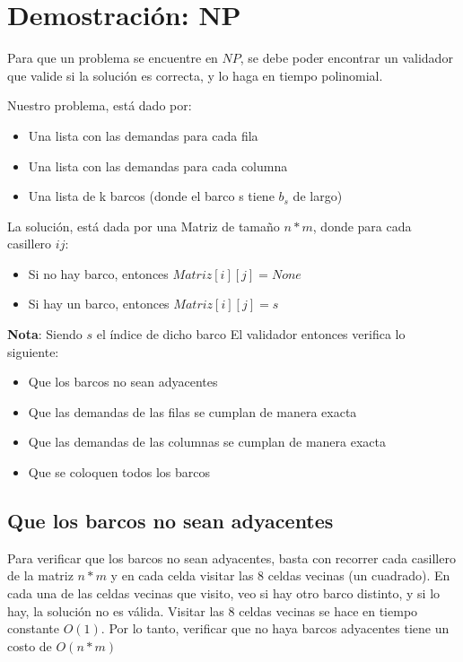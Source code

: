 \section{Demostración: NP}

Para que un problema se encuentre en $NP$, se debe poder encontrar un validador que valide si la solución es correcta, y lo haga en tiempo polinomial.

\vskip0.25cm

Nuestro problema, está dado por:

\begin{itemize}
    \item Una lista con las demandas para cada fila
    \item Una lista con las demandas para cada columna
    \item Una lista de k barcos (donde el barco s tiene $b_{s}$ de largo)
\end{itemize}

La solución, está dada por una Matriz de tamaño $n * m$, donde para cada casillero $ij$:

\begin{itemize}
    \item Si no hay barco, entonces $Matriz[i][j] = None$
    \item Si hay un barco, entonces $Matriz[i][j] = s$
\end{itemize}

\textbf{Nota}: Siendo $s$ el índice de dicho barco
\vskip0.25cm
El validador entonces verifica lo siguiente:

\begin{itemize}
    \item Que los barcos no sean adyacentes
    \item Que las demandas de las filas se cumplan de manera exacta
    \item Que las demandas de las columnas se cumplan de manera exacta
    \item Que se coloquen todos los barcos
\end{itemize}

\subsection{Que los barcos no sean adyacentes}

    Para verificar que los barcos no sean adyacentes, basta con recorrer cada casillero de la matriz $n * m$ y en cada celda visitar las 8 celdas vecinas (un cuadrado).
    En cada una de las celdas vecinas que visito, veo si hay otro barco distinto, y si lo hay, la solución no es válida.
    Visitar las 8 celdas vecinas se hace en tiempo constante $O(1)$. Por lo tanto, verificar que no haya barcos adyacentes tiene un costo de $O(n * m)$

